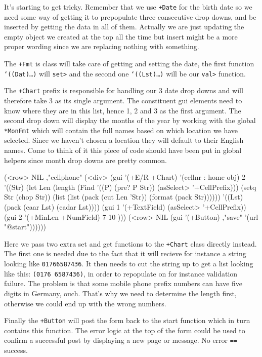 It's starting to get tricky. Remember that we use \texttt{+Date} for
the birth date so we need some way of getting it to prepopulate three
consecutive drop downs, and be inserted by getting the data in all of
them. Actually we are just updating the empty object we created at the
top all the time but insert might be a more proper wording since we
are replacing nothing with something.

The \texttt{+Fmt} is class will take care of getting and setting the
date, the first function \texttt{‘((Dat)\dots{})} will \texttt{set>}
and the second one \texttt{‘((Lst)\dots{})} will be our \texttt{val>}
function.

The \texttt{+Chart} prefix is responsible for handling our 3 date drop
downs and will therefore take 3 as its single argument. The
constituent gui elements need to know where they are in this list,
hence 1, 2 and 3 as the first argument. The second drop down will
display the months of the year by working with the global
\texttt{*MonFmt} which will contain the full names based on which
location we have selected. Since we haven't chosen a location they
will default to their English names. Come to think of it this piece of
code should have been put in global helpers since month drop downs are
pretty common.

\begin{wideverbatim}
(<row> NIL ,"cellphone" 
   (<div> 
      (gui '(+E/R +Chart) '(cellnr : home obj) 2 
         '((Str)
             (let Len 
                (length 
                   (Find '((P) (pre? P Str)) (asSelect> '+CellPrefix)))
                (setq Str (chop Str))
                (list 
                   (list (pack (cut Len 'Str)) (format (pack Str))))))
         '((Lst) (pack (caar Lst) (cadar Lst))))
      (gui 1 '(+TextField) (asSelect> '+CellPrefix))
      (gui 2 '(+MinLen +NumField) 7 10 )))
(<row> NIL (gui '(+Button) ,"save" '(url "@start"))))))
\end{wideverbatim}

Here we pass two extra set and get functions to the \texttt{+Chart}
class directly instead. The first one is needed due to the fact that
it will recieve for instance a string looking like
\texttt{01766587436}. It then needs to cut the string up to get a list
looking like this: \texttt{(0176 6587436)}, in order to repopulate on
for instance validation failure. The problem is that some mobile phone
prefix numbers can have five digits in Germany, ouch. That's why we
need to determine the length first, otherwise we could end up with the
wrong numbers.

Finally the \texttt{+Button} will post the form back to the start
function which in turn contains this function. The error logic at the
top of the form could be used to confirm a successful post by
displaying a new page or message. No error \texttt{==} success.

